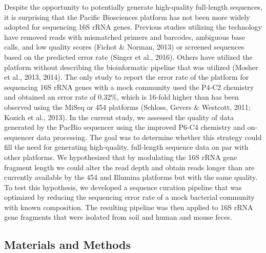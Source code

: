 \documentclass[11pt,]{article}
\begin{document}
Despite the opportunity to potentially generate high-quality full-length
sequences, it is surprising that the Pacific Biosciences platform has
not been more widely adopted for sequencing 16S rRNA genes. Previous
studies utilizing the technology have removed reads with mismatched
primers and barcodes, ambiguous base calls, and low quality scores
(Fichot \& Norman, 2013) or screened sequences based on the predicted
error rate (Singer et al., 2016). Others have utilized the platform
without describing the bioinformatic pipeline that was utilized (Mosher
et al., 2013, 2014). The only study to report the error rate of the
platform for sequencing 16S rRNA genes with a mock community used the
P4-C2 chemistry and obtained an error rate of 0.32\%, which is 16-fold
higher than has been observed using the MiSeq or 454 platforms (Schloss,
Gevers \& Westcott, 2011; Kozich et al., 2013). In the current study, we
assessed the quality of data generated by the PacBio sequencer using the
improved P6-C4 chemistry and on-sequencer data processing. The goal was
to determine whether this strategy could fill the need for generating
high-quality, full-length sequence data on par with other platforms. We
hypothesized that by modulating the 16S rRNA gene fragment length we
could alter the read depth and obtain reads longer than are currently
available by the 454 and Illumina platforms but with the same quality.
To test this hypothesis, we developed a sequence curation pipeline that
was optimized by reducing the sequencing error rate of a mock bacterial
community with known composition. The resulting pipeline was then
applied to 16S rRNA gene fragments that were isolated from soil and
human and mouse feces.

\subsection{Materials and Methods}\label{materials-and-methods}
\end{document}
